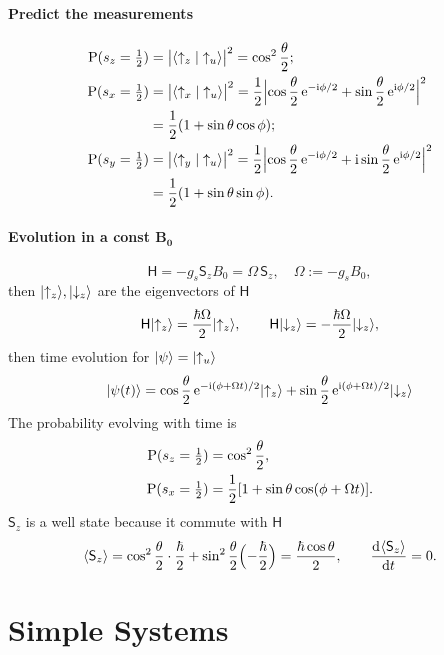 \documentclass{article}
\newcommand*{\op}[1]{\mathsf{#1}}
\begin{document}
\paragraph{Predict the measurements}
\begin{align*}
	\P(s_z=\textstyle\frac12) & =\bigabs{\brkt{\uparrow_z}{\uparrow_u}}^2=\cos^2\frac\theta{2};                                                                       \\
	\P(s_x=\textstyle\frac12) & =\bigabs{\brkt{\uparrow_x}{\uparrow_u}}^2=\frac12\Bigabs{\cos\frac{\theta}2\e^{-\i\phi/2}+\sin\frac{\theta}2\e^{\i\phi/2}}^2  \\
	                         & =\frac12(1+\sin\theta\cos\phi);                                                                                                    \\
	\P(s_y=\textstyle\frac12) & =\bigabs{\brkt{\uparrow_y}{\uparrow_u}}^2=\frac12\Bigabs{\cos\frac{\theta}2\e^{-\i\phi/2}+\i\sin\frac{\theta}2\e^{\i\phi/2}}^2 \\
	                         & =\frac12(1+\sin\theta\sin\phi).
\end{align*}
\paragraph{Evolution in a const $\bm{B_0}$}
$$\op{H}=-g_s\op{S}_zB_0=\Omega\,\op{S}_z,\quad\Omega:=-g_sB_0,$$
then $\ket{\uparrow_z},\ket{\downarrow_z}$ are the eigenvectors of $\op{H}$
$$\op{H}\ket{\uparrow_z}=\frac{\hbar\Omega}2\ket{\uparrow_z},\qquad\op{H}\ket{\downarrow_z}=-\frac{\hbar\Omega}2\ket{\downarrow_z},$$
then time evolution for $\ket\psi=\ket{\uparrow_u}$
$$\ket{\psi(t)}=\cos\frac{\theta}2\e^{-\i(\phi+\Omega t)/2}\ket{\uparrow_z}+\sin\frac{\theta}2\e^{\i(\phi+\Omega t)/2}\ket{\downarrow_z}$$
The probability evolving with time is
\begin{align*}
	\P(s_z=\textstyle\frac12) & =\cos^2\frac\theta{2},                         \\
	\P(s_x=\textstyle\frac12) & =\frac12[1+\sin\theta\cos(\phi+\Omega t)].
\end{align*}
$\op{S}_z$ is a well state because it commute with $\op{H}$
$$\ave{\op{S}_z}=\cos^2\frac\theta{2}\cdot\frac\hbar{2}+\sin^2\frac\theta{2}\Bigl(-\frac\hbar{2}\Bigr)=\frac{\hbar\cos\theta}2,\qquad\dv{\ave{\op{S}_z}}t=0.$$
\clearpage
\section{Simple Systems}
\end{document}
